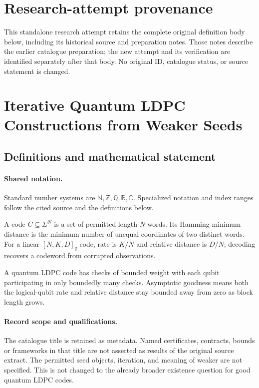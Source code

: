 \documentclass[11pt]{article}
\begin{document}
\section*{Research-attempt provenance}
This standalone research attempt retains the complete original definition body below,
including its historical source and preparation notes. Those notes describe the
earlier catalogue preparation; the new attempt and its verification are identified
separately after that body. No original ID, catalogue status, or source statement is changed.

\section{Iterative Quantum LDPC Constructions from Weaker Seeds}\label{statement}

\subsection{Definitions and mathematical statement}

\paragraph{Shared notation.}Standard number systems are $\mathbb N,\mathbb Z,\mathbb Q,\mathbb R,\mathbb C$. Specialized notation and index ranges follow the cited source and the definitions below.


A code $C\subseteq\Sigma^N$ is a set of permitted length-$N$ words. Its Hamming minimum distance is the minimum number of unequal coordinates of two distinct words. For a linear $[N,K,D]_q$ code, rate is $K/N$ and relative distance is $D/N$; decoding recovers a codeword from corrupted observations.

A quantum LDPC code has checks of bounded weight with each qubit participating in only boundedly many checks. Asymptotic goodness means both the logical-qubit rate and relative distance stay bounded away from zero as block length grows.
\paragraph{Record scope and qualifications.}
The catalogue title is retained as metadata. Named certificates, contracts, bounds or frameworks in that title are not asserted as results of the original source extract.
The permitted seed objects, iteration, and meaning of weaker are not specified. This is not changed to the already broader existence question for good quantum LDPC codes.
\end{document}
